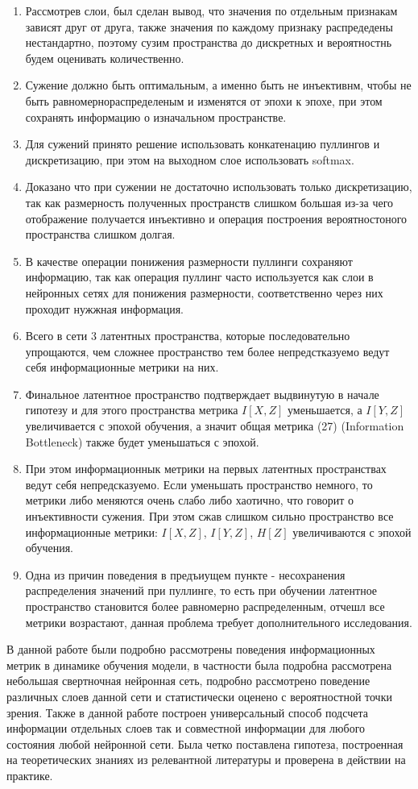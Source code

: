 \begin{enumerate}
\item Рассмотрев слои, был сделан вывод, что значения по отдельным признакам зависят друг от друга, также значения по каждому признаку распредедены нестандартно, поэтому сузим пространства до дискретных и вероятностнь будем оценивать количественно.
\item Сужение должно быть оптимальным, а именно быть не инъективнм, чтобы не быть равномернораспределеным и изменятся от эпохи к эпохе, при этом сохранять информацию о изначальном пространстве.
\item Для сужений принято решение использовать конкатенацию пуллингов и дискретизацию, при этом на выходном слое использовать softmax.
\item Доказано что при сужении не достаточно использовать только дискретизацию, так как размерность полученных пространств слишком большая из-за чего отображение получается инъективно и операция построения вероятностоного пространства слишком долгая.
\item В качестве операции понижения размерности пуллинги сохраняют информацию, так как операция пуллинг часто используется как слои в нейронных сетях для понижения размерности, соответственно через них проходит нужжная информация.
\item Всего в сети 3 латентных пространства, которые последовательно упрощаются, чем сложнее пространство тем более непредстказуемо ведут себя информационные метрики на них.
\item Финальное латентное пространство подтверждает выдвинутую в начале гипотезу и для этого пространства метрика $I[X, Z]$ уменьшается, а $I[Y, Z]$ увеличивается с эпохой обучения, а значит общая метрика (27) (Information Bottleneck) также будет уменьшаться с эпохой.
\item При этом информационнык метрики на первых латентных пространствах ведут себя непредсказуемо. Если уменьшать пространство немного, то метрики либо меняются очень слабо либо хаотично, что говорит о инъективности сужения. При этом сжав слишком сильно пространство все информационные метрики: $I[X, Z]$, $I[Y, Z]$, $H[Z]$ увеличиваются с эпохой обучения.
\item Одна из причин поведения в предъиущем пункте - несохранения распределения значений при пуллинге, то есть при обучении латентное пространство становится более равномерно распределенным, отчешл все метрики возрастают, данная проблема требует дополнительного исследования.
\end{enumerate}

В данной работе были подробно рассмотрены поведения информационных метрик в динамике обучения модели, в частности была подробна рассмотрена небольшая свертночная нейронная сеть, подробно рассмотрено поведение различных слоев данной сети и статистически оценено с вероятностной точки зрения. Также в данной работе построен универсальный способ подсчета информации отдельных слоев так и совместной информации для любого состояния любой нейронной сети. Была четко поставлена гипотеза, построенная на теоретических знаниях из релевантной литературы и проверена в действии на практике.

